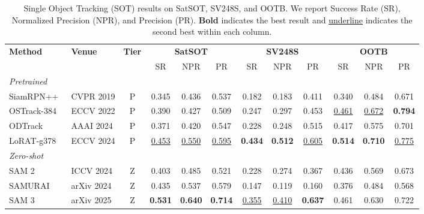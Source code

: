 \begin{table}[t]
\centering
\caption{Single Object Tracking (SOT) results on SatSOT, SV248S, and OOTB.
We report Success Rate (SR), Normalized Precision (NPR), and Precision (PR).
\textbf{Bold} indicates the best result and \underline{underline} indicates the second best within each column.}
\label{tab:sot_results}
\setlength{\tabcolsep}{4pt}
\renewcommand{\arraystretch}{1.15}
\begin{tabular}{l l c ccc ccc ccc}
\toprule
\multirow{2}{*}{\textbf{Method}} & \multirow{2}{*}{\textbf{Venue}} & \multirow{2}{*}{\textbf{Tier}}
 & \multicolumn{3}{c}{\textbf{SatSOT}}
 & \multicolumn{3}{c}{\textbf{SV248S}}
 & \multicolumn{3}{c}{\textbf{OOTB}} \\
\cmidrule(lr){4-6} \cmidrule(lr){7-9} \cmidrule(lr){10-12}
 & & & SR & NPR & PR & SR & NPR & PR & SR & NPR & PR \\
\midrule
\multicolumn{12}{l}{\textit{Pretrained}} \\
SiamRPN++~\cite{li2019siamrpn++}    & CVPR 2019  & P & 0.345             & 0.436             & 0.537             & 0.182             & 0.183             & 0.411             & 0.340             & 0.484             & 0.671             \\
OSTrack-384~\cite{ye2022joint}  & ECCV 2022  & P & 0.390             & 0.427             & 0.509             & 0.247             & 0.297             & 0.453             & \underline{0.461} & \underline{0.672} & \textbf{0.794}    \\
ODTrack~\cite{zheng2024odtrack}      & AAAI 2024  & P & 0.371             & 0.420             & 0.547             & 0.228             & 0.248             & 0.515             & 0.417             & 0.575             & 0.701             \\
LoRAT-g378~\cite{lin2024tracking}   & ECCV 2024  & P & \underline{0.453} & \underline{0.550} & \underline{0.595} & \textbf{0.434}    & \textbf{0.512}    & \underline{0.605} & \textbf{0.514}    & \textbf{0.710}    & \underline{0.775} \\
\midrule
\multicolumn{12}{l}{\textit{Zero-shot}} \\
SAM 2~\cite{ravi2024sam}        & ICCV 2024  & Z & 0.403             & 0.485             & 0.521             & 0.228             & 0.274             & 0.367             & 0.436             & 0.569             & 0.673             \\
SAMURAI~\cite{yang2026samurai}      & arXiv 2024 & Z & 0.435             & 0.537             & 0.579             & 0.147             & 0.119             & 0.160             & 0.376             & 0.484             & 0.568             \\
SAM 3~\cite{carion2026sam3}        & arXiv 2025 & Z & \textbf{0.531}    & \textbf{0.640}    & \textbf{0.714}    & \underline{0.355} & \underline{0.410} & \textbf{0.637}    & 0.461             & 0.630             & 0.722             \\
\bottomrule
\end{tabular}
\end{table}
